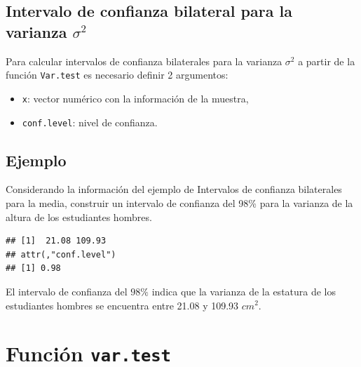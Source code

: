 \documentclass[10pt,]{krantz}
\makeatletter
\newenvironment{Shaded}{\begin{snugshade}}{\end{snugshade}}
\newcommand{\KeywordTok}[1]{\textcolor[rgb]{0.13,0.29,0.53}{\textbf{#1}}}
\newcommand{\DataTypeTok}[1]{\textcolor[rgb]{0.13,0.29,0.53}{#1}}
\newcommand{\FloatTok}[1]{\textcolor[rgb]{0.00,0.00,0.81}{#1}}
\newcommand{\StringTok}[1]{\textcolor[rgb]{0.31,0.60,0.02}{#1}}
\newcommand{\CommentTok}[1]{\textcolor[rgb]{0.56,0.35,0.01}{\textit{#1}}}
\newcommand{\OperatorTok}[1]{\textcolor[rgb]{0.81,0.36,0.00}{\textbf{#1}}}
\newcommand{\NormalTok}[1]{#1}
\providecommand{\tightlist}{%
  \setlength{\itemsep}{0pt}\setlength{\parskip}{0pt}}
\newenvironment{kframe}{%
\medskip{}
\setlength{\fboxsep}{.8em}
 \def\at@end@of@kframe{}%
 \ifinner\ifhmode%
  \def\at@end@of@kframe{\end{minipage}}%
  \begin{minipage}{\columnwidth}%
 \fi\fi%
 \def\FrameCommand##1{\hskip\@totalleftmargin \hskip-\fboxsep
 \colorbox{shadecolor}{##1}\hskip-\fboxsep
     \hskip-\linewidth \hskip-\@totalleftmargin \hskip\columnwidth}%
 \MakeFramed {\advance\hsize-\width
   \@totalleftmargin\z@ \linewidth\hsize
   \@setminipage}}%
 {\par\unskip\endMakeFramed%
 \at@end@of@kframe}
\renewenvironment{Shaded}{\begin{kframe}}{\end{kframe}}
\makeatother
\begin{document}
\subsection{\texorpdfstring{Intervalo de confianza bilateral para la
varianza
\(\sigma^2\)}{Intervalo de confianza bilateral para la varianza \textbackslash{}sigma\^{}2}}\label{intervalo-de-confianza-bilateral-para-la-varianza-sigma2}

Para calcular intervalos de confianza bilaterales para la varianza
\(\sigma^2\) a partir de la función \texttt{Var.test} es necesario
definir 2 argumentos:

\begin{itemize}
\tightlist
\item
  \texttt{x}: vector numérico con la información de la muestra,
\item
  \texttt{conf.level}: nivel de confianza.
\end{itemize}

\subsection*{Ejemplo}\label{ejemplo-59}


Considerando la información del ejemplo de Intervalos de confianza
bilaterales para la media, construir un intervalo de confianza del 98\%
para la varianza de la altura de los estudiantes hombres.

\begin{Shaded}
\end{Shaded}

\begin{verbatim}
## [1]  21.08 109.93
## attr(,"conf.level")
## [1] 0.98
\end{verbatim}

El intervalo de confianza del \(98\%\) indica que la varianza de la
estatura de los estudiantes hombres se encuentra entre 21.08 y 109.93
\(cm^{2}\).

\section{\texorpdfstring{Función
\texttt{var.test}}{Función var.test}}\label{funcion-var.test-1}
\end{document}
